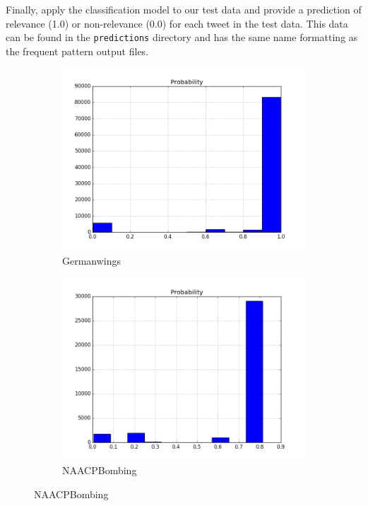 Finally, apply the classification model to our test data and provide a prediction of relevance (1.0) or non-relevance (0.0) for each tweet in the test data. This data can be found in the \texttt{predictions} directory and has the same name formatting as the frequent pattern output files.


\begin{figure}[t!] %
	\begin{subfigure}{0.50\textwidth}
		\includegraphics[width=\linewidth]{figures/Germanwings.png}
		\caption{Germanwings} \label{fig:a}
	\end{subfigure}\hspace*{\fill}
	\begin{subfigure}{0.50\textwidth}
		\includegraphics[width=\linewidth]{figures/NAACPBombing.png}
		\caption{NAACPBombing} \label{fig:b}
	\end{subfigure}


\end{figure}
